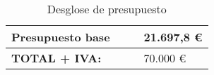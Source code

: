 \documentclass[a4paper,11pt]{report}
\begin{document}
\begin{table}[h]
\begin{tabular}{|l|l|l|l|}
Presupuesto base                               &                                                    &                                                                                                   & 21.697,8 \euro                                 \\ \hline
\textbf{TOTAL + IVA:}                          &                                                    &                                                                                                   & 70.000 \euro                                   \\ \hline
\end{tabular}
\caption{Desglose de presupuesto}
\end{table}
\end{document}
